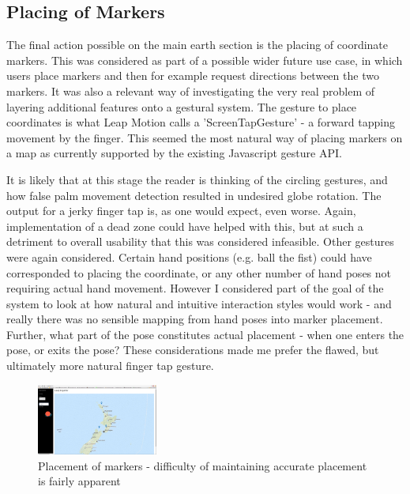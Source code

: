 \documentclass{sigplanconf}
\begin{document}
\subsection{Placing of Markers}

The final action possible on the main earth section is the placing of coordinate markers. This was considered as part of a possible wider future use case, in which users place markers and then for example request directions between the two markers. It was also a relevant way of investigating the very real problem of layering additional features onto a gestural system. The gesture to place coordinates is what Leap Motion calls a 'ScreenTapGesture' - a forward tapping movement by the finger. This seemed the most natural way of placing markers on a map as currently supported by the existing Javascript gesture API. 

It is likely that at this stage the reader is thinking of the circling gestures, and how false palm movement detection resulted in undesired globe rotation. The output for a jerky finger tap is, as one would expect, even worse. Again, implementation of a dead zone could have helped with this, but at such a detriment to overall usability that this was considered infeasible. Other gestures were again considered. Certain hand positions (e.g. ball the fist) could have corresponded to placing the coordinate, or any other number of hand poses not requiring actual hand movement. However I considered part of the goal of the system to look at how natural and intuitive interaction styles would work - and really there was no sensible mapping from hand poses into marker placement. Further, what part of the pose constitutes actual placement - when one enters the pose, or exits the pose? These considerations made me prefer the flawed, but ultimately more natural finger tap gesture.

\begin{center}
\begin{figure}[h!]
\centering
\includegraphics[width=150px]{images/marker_placement.png}
\caption{Placement of markers - difficulty of maintaining accurate placement is fairly apparent}
\label{fig:halo_comparison}
\vspace{-10pt}
\end{figure}
\end{center}
\end{document}
